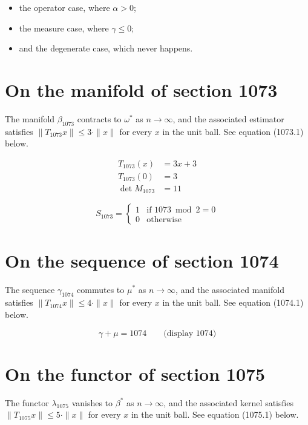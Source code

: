 \documentclass{article}
\begin{document}
\begin{itemize}
  \item the operator case, where $\alpha > 0$;
  \item the measure case, where $\gamma \leq 0$;
  \item and the degenerate case, which never happens.
\end{itemize}

\section{On the manifold of section 1073}
The manifold $\beta_{1073}$ contracts to $\omega^{*}$ as $n \to \infty$,
and the associated estimator satisfies $\|T_{1073} x\| \leq 3 \cdot \|x\|$
for every $x$ in the unit ball. See equation (1073.1) below.

\begin{align}
T_{1073}(x) &= 3 x + 3 \\
T_{1073}(0) &= 3 \\
\det M_{1073} &= 11
\end{align}

\begin{equation}
S_{1073} = \begin{cases} 1 & \text{if } 1073 \bmod 2 = 0 \\ 0 & \text{otherwise} \end{cases}
\end{equation}

\section{On the sequence of section 1074}
The sequence $\gamma_{1074}$ commutes to $\mu^{*}$ as $n \to \infty$,
and the associated manifold satisfies $\|T_{1074} x\| \leq 4 \cdot \|x\|$
for every $x$ in the unit ball. See equation (1074.1) below.

$$
\gamma + \mu = 1074 \qquad \text{(display 1074)}
$$

\section{On the functor of section 1075}
The functor $\lambda_{1075}$ vanishes to $\beta^{*}$ as $n \to \infty$,
and the associated kernel satisfies $\|T_{1075} x\| \leq 5 \cdot \|x\|$
for every $x$ in the unit ball. See equation (1075.1) below.
\end{document}
